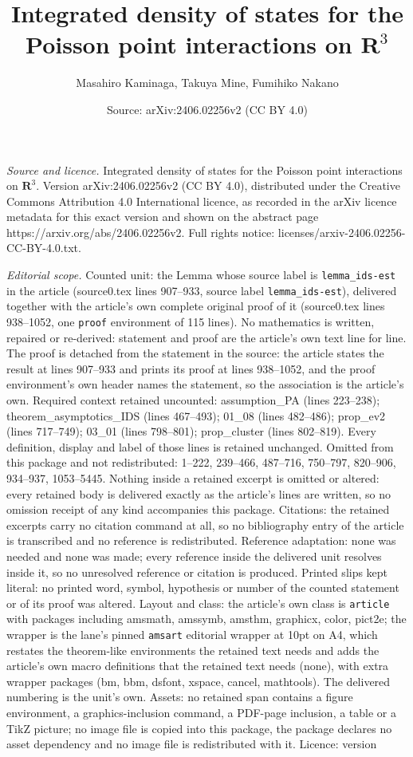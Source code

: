 \documentclass[10pt,a4paper]{amsart}
\title[Integrated density of states for the Poisson point interacti]{Integrated density of states for the Poisson point interactions on $\mathbf{R}^3$}
\author{Masahiro Kaminaga, Takuya Mine, Fumihiko Nakano}
\date{Source: arXiv:2406.02256v2 (CC BY 4.0)}
\begin{document}
\maketitle

\noindent\emph{Source and licence.} Integrated density of states for the Poisson point interactions on $\mathbf{R}^3$. Version arXiv:2406.02256v2 (CC BY 4.0), distributed under the Creative Commons Attribution 4.0 International licence, as recorded in the arXiv licence metadata for this exact version and shown on the abstract page https://arxiv.org/abs/2406.02256v2. Full rights notice: licenses/arxiv-2406.02256-CC-BY-4.0.txt.\par\smallskip

\noindent\textit{Editorial scope.} Counted unit: the Lemma whose source label is \texttt{lemma\_ids-est} in the article (source0.tex lines 907--933, source label \texttt{lemma\_ids-est}), delivered together with the article's own complete original proof of it (source0.tex lines 938--1052, one \texttt{proof} environment of 115 lines). No mathematics is written, repaired or re-derived: statement and proof are the article's own text line for line. The proof is detached from the statement in the source: the article states the result at lines 907--933 and prints its proof at lines 938--1052, and the proof environment's own header names the statement, so the association is the article's own. Required context retained uncounted: assumption\_PA (lines 223--238); theorem\_asymptotics\_IDS (lines 467--493); 01\_08 (lines 482--486); prop\_ev2 (lines 717--749); 03\_01 (lines 798--801); prop\_cluster (lines 802--819). Every definition, display and label of those lines is retained unchanged. Omitted from this package and not redistributed: 1--222, 239--466, 487--716, 750--797, 820--906, 934--937, 1053--5445. Nothing inside a retained excerpt is omitted or altered: every retained body is delivered exactly as the article's lines are written, so no omission receipt of any kind accompanies this package. Citations: the retained excerpts carry no citation command at all, so no bibliography entry of the article is transcribed and no reference is redistributed. Reference adaptation: none was needed and none was made; every reference inside the delivered unit resolves inside it, so no unresolved reference or citation is produced. Printed slips kept literal: no printed word, symbol, hypothesis or number of the counted statement or of its proof was altered. Layout and class: the article's own class is \texttt{article} with packages including amsmath, amssymb, amsthm, graphicx, color, pict2e; the wrapper is the lane's pinned \texttt{amsart} editorial wrapper at 10pt on A4, which restates the theorem-like environments the retained text needs and adds the article's own macro definitions that the retained text needs (none), with extra wrapper packages (bm, bbm, dsfont, xspace, cancel, mathtools). The delivered numbering is the unit's own. Assets: no retained span contains a figure environment, a graphics-inclusion command, a PDF-page inclusion, a table or a TikZ picture; no image file is copied into this package, the package declares no asset dependency and no image file is redistributed with it. Licence: version 
\end{document}
